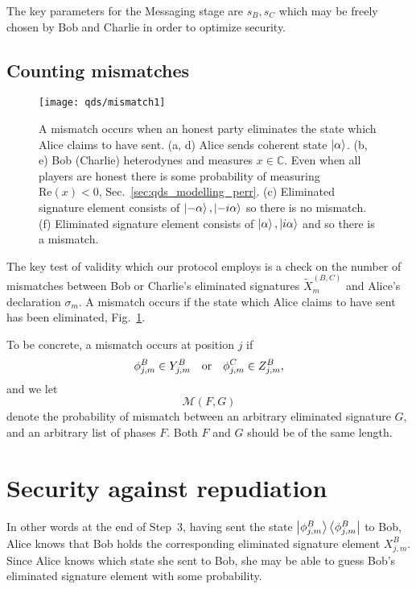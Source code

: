 The key parameters for the Messaging stage are $s_B, s_C$ which may be freely chosen by Bob and Charlie in order to optimize security.

\subsection{Counting mismatches}\label{sec:qds_mismatches}

\begin{figure}[htp]
\centering
\texttt{[image: qds/mismatch1]}
\caption{\label{fig:qds_mismatches} A mismatch occurs when an honest party eliminates the state which Alice claims to have sent. (a, d) Alice sends coherent state $\ket{\alpha}$. (b, e) Bob (Charlie) heterodynes and measures $x \in \mathbb{C}$. Even when all players are honest there is some probability of measuring $\text{Re}\left(x\right) < 0$, Sec.~\ref{sec:qds_modelling_perr}. (c) Eliminated signature element consists of $\ket{- \alpha}, \ket{- i \alpha}$ so there is no mismatch. (f) Eliminated signature element consists of $\ket{\alpha}, \ket{i \alpha}$ and so there is a mismatch.}
\end{figure}


The key test of validity which our protocol employs is a check on the number of mismatches between Bob or Charlie's eliminated signatures $\tilde{X}^{\left(B, C\right)}_m$ and Alice's declaration $\sigma_m$. A mismatch occurs if the state which Alice claims to have sent has been eliminated, Fig.~\ref{fig:qds_mismatches}. 

To be concrete, a mismatch occurs at position $j$ if
\begin{equation}
\phi_{j, m}^B \in Y_{j, m}^B \qq{or} \phi_{j, m}^C \in Z_{j, m}^B, 
\end{equation}
and we let
\begin{equation}
\mathcal{M}\left(F, G\right)
\end{equation}
denote the probability of mismatch between an arbitrary eliminated signature $G$, and an arbitrary list of phases $F$. Both $F$ and $G$ should be of the same length.





\section{Security against repudiation}\label{sec:qds_security_repudiation}
\iffalse
In other words at the end of Step~$3$, having sent the state $\ket{\phi_{j, m}^B}\bra{\phi_{j, m}^B}$ to Bob, Alice knows that Bob holds the corresponding eliminated signature element $X_{j, m}^B$. Since Alice knows which state she sent to Bob, she may be able to guess Bob's eliminated signature element with some probability. 

